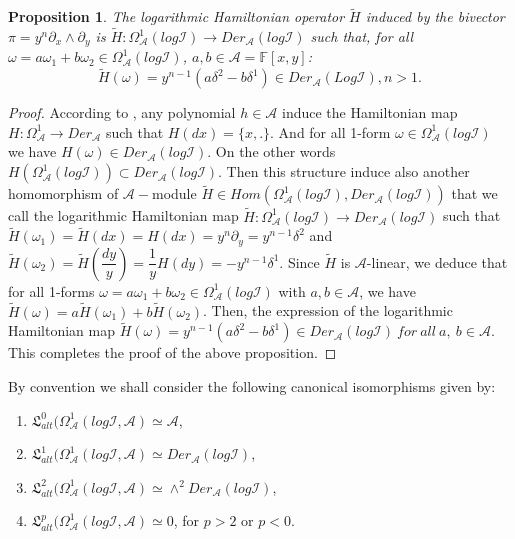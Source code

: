 \documentclass[a4paper, 12pt,oneside,reqno]{amsart}
\newtheorem{proposition}[theorem]{Proposition}
\theoremstyle{definition}
\begin{document}
\begin{proposition}
  The logarithmic  Hamiltonian operator $\tilde{H}$ induced by the  bivector $\pi = y^n \partial_{x} \wedge \partial_{y}$ 
 is
 $\tilde{H}: \Omega_{\mathcal{A}}^{1}(log\mathcal{I}) \longrightarrow
 Der_{\mathcal{A}}(log \mathcal{I})$  such that, for all $\omega =
 a\omega_{1} + b \omega_{2}\in \Omega_{\mathcal{A}}^{1}(log\mathcal{I})$, $a,b \in \mathcal{A}=\mathbb{F}[x,y]$:
  \begin{equation}
              \tilde{H}(\omega)=   y^{n-1}(a \delta^{2}- b \delta^{1}) \in Der_{\mathcal{A} }(Log \mathcal{I}), n>1.
       \end{equation}
 \end{proposition}
 \begin{proof}
According to \cite{IV}, any polynomial $h\in \mathcal{A}$ induce the Hamiltonian map $H: \Omega^{1}_{\mathcal{A}}\longrightarrow Der_{\mathcal{A}}$ such that $H(dx) = \{x,.\}$. 
And for all 1-form  $\omega \in \Omega_{\mathcal{A}}^{1}(log\mathcal{I})$ we have $H(\omega) \in Der_{\mathcal{A}}(log \mathcal{I})$. On the other words $H(\Omega_{\mathcal{A}}^{1}(log\mathcal{I}) ) \subset Der_{\mathcal{A}}(log \mathcal{I})$.
          Then this structure induce also  another homomorphism of $\mathcal{A}-$module
         $\tilde{H}\in Hom( \Omega_{\mathcal{A}}^{1}(log\mathcal{I}), Der_{\mathcal{A}}(log \mathcal{I}))$
         that we call the logarithmic Hamiltonian map $\tilde{H}: \Omega_{\mathcal{A}}^{1}(log\mathcal{I}) \longrightarrow   Der_{\mathcal{A}}(log \mathcal{I})$ such that  $\tilde{H}(\omega_{1})  = \tilde{H}(dx) = H(dx) = y^n \partial_{y} = y^{n-1}\delta^{2}$ 
 and  $\tilde{H}(\omega_{2}) =   \tilde{H}(\dfrac{dy}{y}) = \dfrac{1}{y}H(dy) = - y^{n-1} \delta^{1}$.
 Since $\tilde{H}$ is $\mathcal{A}$-linear, we
  deduce that for all 1-forms $\omega= a \omega_{1} + b\omega_{2} \in \Omega_{\mathcal{A} }^{1}(log \mathcal{I})$ with $a, b \in \mathcal{A}$, we have $\tilde{H}(\omega)= a \tilde{H}(\omega_{1}) + b\tilde{H}(\omega_{2})$. Then, the expression of the   logarithmic  Hamiltonian map 
$   \tilde{H}(\omega)=   y^{n-1}(a \delta^{2}- b \delta^{1}) \in Der_{\mathcal{A} }(log \mathcal{I}) ~for ~all~a,~b\in \mathcal{A}.$
       This completes the proof of the above proposition.
 \end{proof}
 By convention we shall consider the following canonical isomorphisms given by:
  \begin{enumerate} 
  \item[$\bullet$] $\mathfrak{L}_{alt}^{0}(\Omega^{1}_{\mathcal{A}}(log\mathcal{I}, \mathcal{A}) \simeq \mathcal{A}$, 
\item[$\bullet$] $\mathfrak{L}_{alt}^{1}(\Omega^{1}_{\mathcal{A}}(log\mathcal{I}, \mathcal{A}) \simeq  Der_{\mathcal{A} }(log \mathcal{I}) $,
 \item[$\bullet$] $\mathfrak{L}_{alt}^{2}(\Omega^{1}_{\mathcal{A}}(log\mathcal{I} , \mathcal{A}) \simeq \wedge^{2} Der_{\mathcal{A} }(log \mathcal{I}) $,
    \item[$\bullet$] $\mathfrak{L}_{alt}^{p}(\Omega^{1}_{\mathcal{A}}(log\mathcal{I} , \mathcal{A}) \simeq 0$, for $p>2$ or $p<0$.
 \end{enumerate} 
\end{document}
